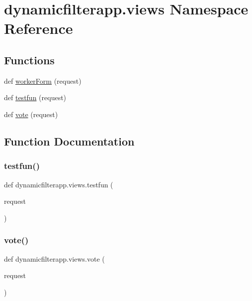 \hypertarget{namespacedynamicfilterapp_1_1views}{}\section{dynamicfilterapp.\+views Namespace Reference}
\label{namespacedynamicfilterapp_1_1views}
\subsection*{Functions}
\begin{DoxyCompactItemize}
\item 
def \mbox{\hyperlink{namespacedynamicfilterapp_1_1views_a41bd6e65140c4010e5aa8332ac5737ca}{worker\+Form}} (request)
\item 
def \mbox{\hyperlink{namespacedynamicfilterapp_1_1views_a83f294ad700bd5ce7820b6749489e10e}{testfun}} (request)
\item 
def \mbox{\hyperlink{namespacedynamicfilterapp_1_1views_a0b8356871afd7c5f24877793011b773c}{vote}} (request)
\end{DoxyCompactItemize}


\subsection{Function Documentation}
\mbox{\label{namespacedynamicfilterapp_1_1views_a83f294ad700bd5ce7820b6749489e10e}} 
\subsubsection{\texorpdfstring{testfun()}{testfun()}}
{\footnotesize\ttfamily def dynamicfilterapp.\+views.\+testfun (\begin{DoxyParamCaption}\item[{}]{request }\end{DoxyParamCaption})}

\mbox{\label{namespacedynamicfilterapp_1_1views_a0b8356871afd7c5f24877793011b773c}} 
\subsubsection{\texorpdfstring{vote()}{vote()}}
{\footnotesize\ttfamily def dynamicfilterapp.\+views.\+vote (\begin{DoxyParamCaption}\item[{}]{request }\end{DoxyParamCaption})}

